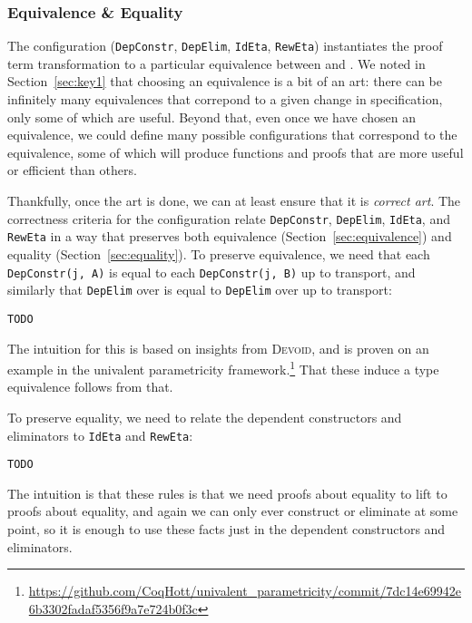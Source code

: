 \subsubsection{Equivalence \& Equality}
\label{sec:art}

The configuration (\lstinline{DepConstr}, \lstinline{DepElim}, \lstinline{IdEta}, \lstinline{RewEta}) instantiates
the proof term transformation to a particular equivalence between \A and \B.
We noted in Section~\ref{sec:key1} that choosing an equivalence is a bit of an art:
there can be infinitely many equivalences that correpond to a 
given change in specification, only some of which are useful.
Beyond that, even once we have chosen an equivalence, we could define many possible configurations that correspond
to the equivalence, some of which will produce functions and proofs that are more useful or efficient than others.

Thankfully, once the art is done, we can at least ensure that it is \textit{correct art}.
The correctness criteria for the configuration relate \lstinline{DepConstr}, \lstinline{DepElim}, \lstinline{IdEta}, and \lstinline{RewEta}
in a way that preserves both equivalence (Section~\ref{sec:equivalence}) and equality (Section~\ref{sec:equality}).
To preserve equivalence, we need that each \lstinline{DepConstr(j, A)} is equal to each \lstinline{DepConstr(j, B)} up to transport,
and similarly that \lstinline{DepElim} over \A is equal to \lstinline{DepElim} over \B up to transport:

\begin{lstlisting}
TODO
\end{lstlisting}
The intuition for this is based on insights from \textsc{Devoid},
and is proven on an example in the univalent parametricity framework.\footnote{\url{https://github.com/CoqHott/univalent_parametricity/commit/7dc14e69942e6b3302fadaf5356f9a7e724b0f3c}}
That these induce a type equivalence follows from that.

To preserve equality, we need to relate the dependent constructors and eliminators to
\lstinline{IdEta} and \lstinline{RewEta}:

\begin{lstlisting}
TODO
\end{lstlisting}
The intuition is that these rules is that we need proofs about equality to lift to proofs about equality,
and again we can only ever construct or eliminate at some point, so it is enough
to use these facts just in the dependent constructors and eliminators.

